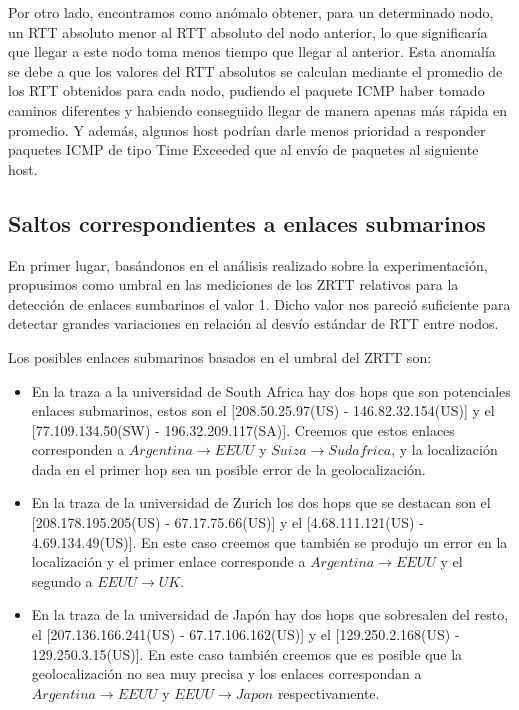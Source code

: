 \documentclass[10pt, a4paper]{article}
\begin{document}
Por otro lado, encontramos como anómalo obtener, para un determinado nodo, un RTT absoluto menor al RTT absoluto del nodo anterior, lo que significaría que llegar a este nodo toma menos tiempo que llegar al anterior. Esta anomalía se debe a que los valores del RTT absolutos se calculan mediante el promedio de los RTT obtenidos para cada nodo, pudiendo el paquete ICMP haber tomado caminos diferentes y habiendo conseguido llegar de manera apenas más rápida en promedio. Y además, algunos host podrían darle menos prioridad a responder paquetes ICMP de tipo Time Exceeded que al envío de paquetes al siguiente host.

\subsection{Saltos correspondientes a enlaces submarinos}

En primer lugar, basándonos en el análisis realizado sobre la experimentación, propusimos como umbral en las mediciones de los ZRTT relativos para la detección de enlaces sumbarinos el valor 1. Dicho valor nos pareció suficiente para detectar grandes variaciones en relación al desvío estándar de RTT entre nodos.

Los posibles enlaces submarinos basados en el umbral del ZRTT son:
\begin{itemize}
\item En la traza a la universidad de South Africa hay dos hops que son potenciales enlaces submarinos, estos son el [208.50.25.97(US) - 146.82.32.154(US)] y el [77.109.134.50(SW) - 196.32.209.117(SA)]. Creemos que estos enlaces corresponden a $Argentina \rightarrow EEUU$ y $Suiza \rightarrow Sudafrica$, y la localización dada en el primer hop sea un posible error de la geolocalización.

\item En la traza de la universidad de Zurich los dos hops que se destacan son el [208.178.195.205(US) - 67.17.75.66(US)] y el [4.68.111.121(US) - 4.69.134.49(US)]. En este caso creemos que también se produjo un error en la localización y el primer enlace corresponde a $Argentina \rightarrow EEUU$  y el segundo a $EEUU \rightarrow UK$.

\item En la traza de la universidad de Japón hay dos hops que sobresalen del resto, el [207.136.166.241(US) - 67.17.106.162(US)] y el [129.250.2.168(US) - 129.250.3.15(US)]. En este caso también creemos que es posible que la geolocalización no sea muy precisa y los enlaces correspondan a $Argentina \rightarrow EEUU$ y $EEUU \rightarrow Japon$ respectivamente.
\end{itemize}
\end{document}
